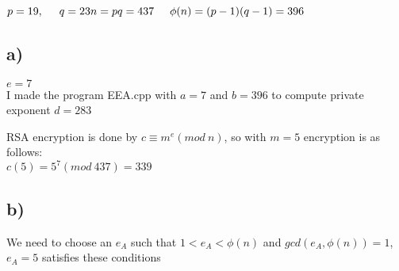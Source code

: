 \documentclass{article}
\begin{document}
$p = 19, \hspace{5 mm} q = 23\\
n = pq = 437 \hspace{5 mm} \phi(n) = (p-1)(q-1) = 396$

\subsection*{a)}
$e = 7$\\
I made the program EEA.cpp with $a=7$ and $b=396$ to compute private exponent $d=283$

RSA encryption is done by $c \equiv m^{e}(mod \: n)$, so with $m=5$ encryption is as follows:\\
$c(5) = 5^{7}(mod \: 437) = 339$

\subsection*{b)}

We need to choose an $e_{A}$ such that $1 < e_{A} < \phi(n)$ and $gcd(e_{A}, \phi(n)) = 1$, $e_{A} = 5$ satisfies these conditions
\end{document}
